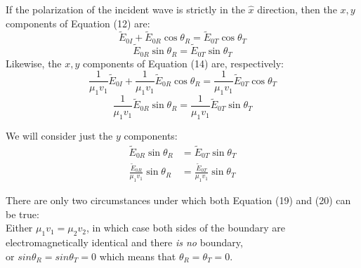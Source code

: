 \documentclass{report}
\begin{document}
\begin{itemize}
\begin{equation}
\end{equation}
If the polarization of the incident wave is strictly in the $\hat{x}$ direction, then the $x,y$ components of Equation (12) are:
\begin{equation}
\tilde{E}_{0I}+\tilde{E}_{0R}\cos{\theta_R} = \tilde{E}_{0T}\cos{\theta_T}
\end{equation}
\begin{equation}
  \tilde{E}_{0R}\sin{\theta_R} = \tilde{E}_{0T}\sin{\theta_T}
\end{equation}
Likewise, the $x,y$ components of Equation (14) are, respectively:
\begin{equation}
\frac{1}{\mu_1v_1}\tilde{E}_{0I}+\frac{1}{\mu_1v_1}\tilde{E}_{0R}\cos{\theta_R} = \frac{1}{\mu_1v_1}\tilde{E}_{0T}\cos{\theta_T}
\end{equation}
\begin{equation}
   \frac{1}{\mu_1v_1}\tilde{E}_{0R}\sin{\theta_R} = \frac{1}{\mu_1v_1}\tilde{E}_{0T}\sin{\theta_T}
\end{equation}

We will consider just the $y$ components:
\begin{align}
    \tilde{E}_{0R}\sin{\theta_R} & = \tilde{E}_{0T}\sin{\theta_T} \\
    \frac{\tilde{E}_{0R}}{\mu_1v_1}\sin{\theta_R} & = \frac{\tilde{E}_{0T}}{\mu_1v_1}\sin{\theta_T}
\end{align}

There are only two circumstances under which both Equation (19) and (20) can be true: \\
Either $\mu_1v_1 = \mu_2v_2$, in which case both sides of the boundary are electromagnetically identical and there \textit{is no} boundary,\\
or $sin{\theta_R} = sin{\theta_T} = 0$ which means that $\theta_R = \theta_T = 0$.





  \end{itemize}
   
\end{document}

